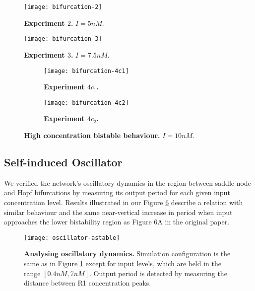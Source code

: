     \begin{figure}[!htbp]
      \centering
      \texttt{[image: bifurcation-2]}
      \caption{\textbf{Experiment $2$.} $I = 5 nM$.}
      \label{fig:bifurcation-2}
    \end{figure}

    \begin{figure}[!htbp]
      \centering
      \texttt{[image: bifurcation-3]}
      \caption{\textbf{Experiment $3$.} $I = 7.5nM$.}
      \label{fig:bifurcation-3}
    \end{figure}

    \begin{figure}[!htb]
      \centering
      \begin{subfigure}[t]{0.72\textwidth}
        \centering
        \texttt{[image: bifurcation-4c1]}
        \caption{\textbf{Experiment $4c_{1}$.}}
        \label{fig:bifurcation-4c1}
      \end{subfigure}
      \begin{subfigure}[t]{0.72\textwidth}
        \centering
        \texttt{[image: bifurcation-4c2]}
        \caption{\textbf{Experiment $4c_{2}$.}}
        \label{fig:bifurcation-4c2}
      \end{subfigure}
      \caption{\textbf{High concentration bistable behaviour.} $I = 10 nM$.}
      \label{fig:bifurcation-4}
    \end{figure}


  \subsection{Self-induced Oscillator}

    We verified the network's oscillatory dynamics in the region between saddle-node and Hopf bifurcations by measuring its output period for each given input concentration level.
    Results illustrated in our Figure \ref{fig:oscillator-astable} describe a relation with similar behaviour and the same near-vertical increase in period when input approaches the lower bistability region as Figure 6A in the original paper.

    \begin{figure}[!htb]
      \centering
      \texttt{[image: oscillator-astable]}
      \caption{\textbf{Analysing oscillatory dynamics.} Simulation configuration is the same as in Figure \ref{fig:bifurcation-2} except for input levels, which are held in the range $[0.4 nM, 7 nM]$. Output period is detected by measuring the distance between R1 concentration peaks.}
      \label{fig:oscillator-astable}
    \end{figure}


